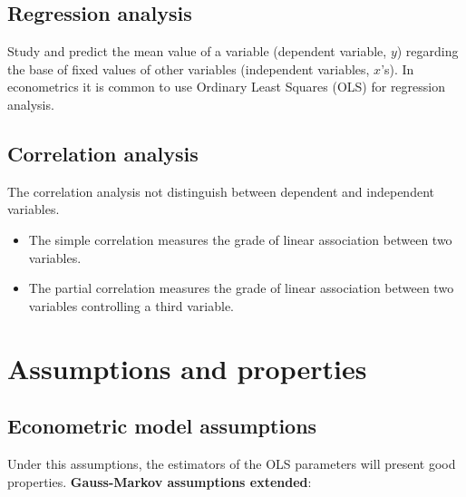 \documentclass[10pt,landscape]{article}
\begin{document}
\begin{multicols}{3}
\subsection*{Regression analysis}
Study and predict the mean value of a variable (dependent variable, $y$) regarding the base of fixed values of other variables (independent variables, $x$'s). In econometrics it is common to use Ordinary Least Squares (OLS) for regression analysis.

\subsection*{Correlation analysis}
The correlation analysis not distinguish between dependent and independent variables.

\begin{itemize}[leftmargin=*]
\item The simple correlation measures the grade of linear association between two variables.
\item The partial correlation measures the grade of linear association between two variables controlling a third variable.
\end{itemize}

\columnbreak

\section*{Assumptions and properties}
\subsection*{Econometric model assumptions}

Under this assumptions, the estimators of the OLS parameters will present good properties. \textbf{Gauss-Markov assumptions extended}:


\end{multicols}
\end{document}
